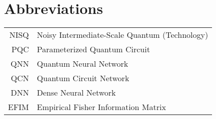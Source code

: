 \chapter*{Abbreviations}
\thispagestyle{plain}



\begin{longtable}{rl}
    NISQ & Noisy Intermediate-Scale Quantum (Technology)  \\
    PQC & Parameterized Quantum Circuit \\
    QNN & Quantum Neural Network\\
    QCN & Quantum Circuit Network\\
    DNN & Dense Neural Network\\
    EFIM & Empirical Fisher Information Matrix\\
\end{longtable}
